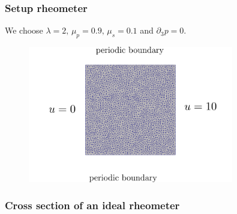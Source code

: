 \documentclass[12pt,a4paper,handout]{beamer}
\theoremstyle{definition}
\theoremstyle{plain}
\begin{document}
\begin{frame}
    \frametitle{Setup rheometer}
    We choose $\lambda =2,\,\mu_p=0.9,\,\mu_s=0.1$ and $\partial_3 p=0$.
    \begin{figure}
        \includegraphics[width=0.8\textwidth]{setuprheo}
    \end{figure}
\end{frame}
\begin{frame}
    \frametitle{Cross section of an ideal rheometer}
    
\end{frame}
\end{document}
